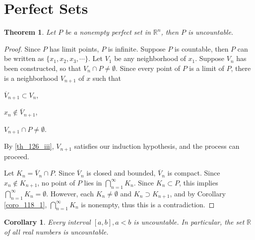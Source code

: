 \documentclass[11pt]{book}
\newtheorem{theorem}{Theorem}[chapter]
\newtheorem{corollary}{Corollary}[theorem]
\theoremstyle{definition}
\numberwithin{equation}{chapter}
\begin{document}
\medskip


\section{Perfect Sets}

\begin{theorem}\label{th_126}
Let $P$ be a nonempty perfect set in $\mathbb{R}^n$, then $P$ is uncountable.
\end{theorem}
\begin{proof}
Since $P$ has limit points, $P$ is infinite. Suppose $P$ is countable, then $P$ can be written as $\{x_1, x_2, x_3, \cdots\}$. Let $V_1$ be any neighborhood of $x_1$. Suppose $V_n$ has been constructed, so that $V_n \cap P \neq \emptyset$. Since every point of $P$ is a limit of $P$, there is a neighborhood $V_{n+1}$ of $x$ such that \begin{enumerate*}[label=(\roman*)]
    \item $\overline{V}_{n+1} \subset V_n$,
    \item $x_n \notin \overline{V}_{n+1}$,
    \item $V_{n+1} \cap P \neq \emptyset$.\label{th_126_iii}
\end{enumerate*}
By \ref{th_126_iii}, $V_{n+1}$ satisfies our induction hypothesis, and the process can proceed. 

Let $K_n = \overline{V}_{n} \cap P$. Since $\overline{V}_{n}$ is closed and bounded, $\overline{V}_{n}$ is compact. Since $x_n \notin K_{n+1}$, no point of $P$ lies in $\bigcap^\infty_{n=1} K_n$. Since $K_n \subset P$, this implies $\bigcap^\infty_{n=1} K_n = \emptyset$. However, each $K_n \neq \emptyset$ and $K_n \supset K_{n+1}$, and by Corollary \ref{coro_118_1}, $\bigcap^\infty_{n=1} K_n$ is nonempty, thus this is a contradiction.
\end{proof}

\medskip

\begin{corollary}
Every interval $[a,b], a < b$ is uncountable. In particular, the set $\mathbb{R}$ of all real numbers is uncountable.
\end{corollary}

\medskip
\end{document}
